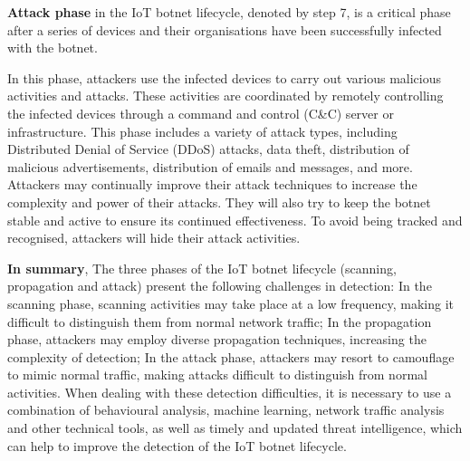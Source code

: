 \documentclass[journal]{IEEEtai}
\begin{document}
\textbf{Attack phase} in the IoT botnet lifecycle, denoted by step 7, is a critical phase after a series of devices and their organisations have been successfully infected with the botnet.

In this phase, attackers use the infected devices to carry out various malicious activities and attacks.
These activities are coordinated by remotely controlling the infected devices through a command and control (C\&C) server or infrastructure.
This phase includes a variety of attack types, including Distributed Denial of Service (DDoS) attacks, data theft, distribution of malicious advertisements, distribution of emails and messages, and more.
Attackers may continually improve their attack techniques to increase the complexity and power of their attacks.
They will also try to keep the botnet stable and active to ensure its continued effectiveness.
To avoid being tracked and recognised, attackers will hide their attack activities.

\textbf{In summary}, The three phases of the IoT botnet lifecycle (scanning, propagation and attack) present the following challenges in detection:
In the scanning phase, scanning activities may take place at a low frequency, making it difficult to distinguish them from normal network traffic;
In the propagation phase, attackers may employ diverse propagation techniques, increasing the complexity of detection;
In the attack phase, attackers may resort to camouflage to mimic normal traffic, making attacks difficult to distinguish from normal activities.
When dealing with these detection difficulties, it is necessary to use a combination of behavioural analysis, machine learning, network traffic analysis and other technical tools, as well as timely and updated threat intelligence, which can help to improve the detection of the IoT botnet lifecycle.
\end{document}
